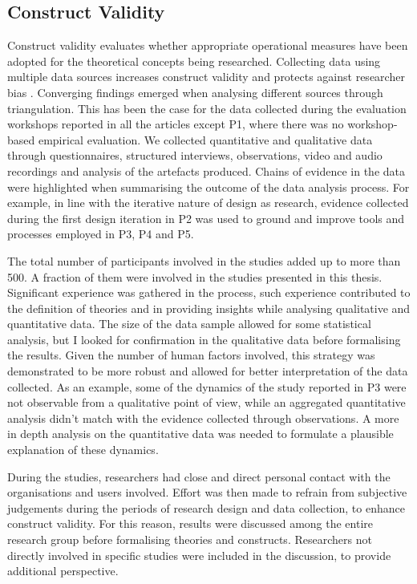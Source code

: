 \subsection{Construct Validity}
Construct validity evaluates whether appropriate operational measures have been adopted for the theoretical concepts being researched.
Collecting data using multiple data sources increases construct validity and protects against researcher bias \autocites{perakyla_reliability_1998}{flick_triangulation_1992}. Converging findings emerged when analysing different sources through triangulation. This has been the case for the data collected during the evaluation workshops reported in all the articles except P1, where there was no workshop-based empirical evaluation. We collected quantitative and qualitative data through questionnaires, structured interviews, observations, video and audio recordings and analysis of the artefacts produced. Chains of evidence in the data \autocites{griggs_analysing_1987}{hirschman_humanistic_1986} were highlighted when summarising the outcome of the data analysis process. For example, in line with the iterative nature of design as research, evidence collected during the first design iteration in P2 was used to ground and improve tools and processes employed in P3, P4 and P5.

The total number of participants involved in the studies added up to more than 500. A fraction of them were involved in the studies presented in this thesis. Significant experience was gathered in the process, such experience contributed to the definition of theories and in providing insights while analysing qualitative and quantitative data.
The size of the data sample allowed for some statistical analysis, but I looked for confirmation in the qualitative data before formalising the results. Given the number of human factors involved, this strategy was demonstrated to be more robust and allowed for better interpretation of the data collected. As an example, some of the dynamics of the study reported in P3 were not observable from a qualitative point of view, while an aggregated quantitative analysis didn't match with the evidence collected through observations. A more in depth analysis on the quantitative data was needed to formulate a plausible explanation of these dynamics.

During the studies, researchers had close and direct personal contact with the organisations and users involved. Effort was then made to refrain from subjective judgements during the periods of research design and data collection, to enhance construct validity. For this reason, results were discussed among the entire research group before formalising theories and constructs. Researchers not directly involved in specific studies were included in the discussion, to provide additional perspective.

